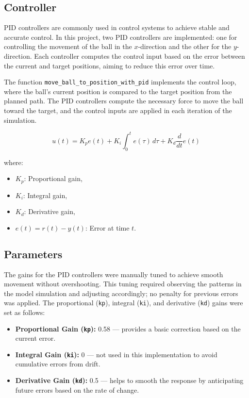 \documentclass[12pt]{article}
\begin{document}
\subsection{Controller}
PID controllers are commonly used in control systems to achieve stable and accurate control. In this project, two PID controllers are implemented: one for controlling the movement of the ball in the \(x\)-direction and the other for the \(y\)-direction. Each controller computes the control input based on the error between the current and target positions, aiming to reduce this error over time.

The function \texttt{move\_ball\_to\_position\_with\_pid} implements the control loop, where the ball’s current position is compared to the target position from the planned path. The PID controllers compute the necessary force to move the ball toward the target, and the control inputs are applied in each iteration of the simulation.

\begin{equation}
u(t) = K_p e(t) + K_i \int_0^t e(\tau) \, d\tau + K_d \frac{d}{dt} e(t)
\end{equation}

where:
\begin{itemize}
    \item \( K_p \): Proportional gain,
    \item \( K_i \): Integral gain,
    \item \( K_d \): Derivative gain,
    \item \( e(t) = r(t) - y(t) \): Error at time \( t \).
\end{itemize}

\subsection{Parameters}
The gains for the PID controllers were manually tuned to achieve smooth movement without overshooting. This tuning required observing the patterns in the model simulation and adjusting accordingly; no penalty for previous errors was applied. The proportional (\texttt{kp}), integral (\texttt{ki}), and derivative (\texttt{kd}) gains were set as follows:
\begin{itemize}
    \item \textbf{Proportional Gain (\texttt{kp}):} 0.58 — provides a basic correction based on the current error.
    \item \textbf{Integral Gain (\texttt{ki}):} 0 — not used in this implementation to avoid cumulative errors from drift.
    \item \textbf{Derivative Gain (\texttt{kd}):} 0.5 — helps to smooth the response by anticipating future errors based on the rate of change.
\end{itemize}
\end{document}
